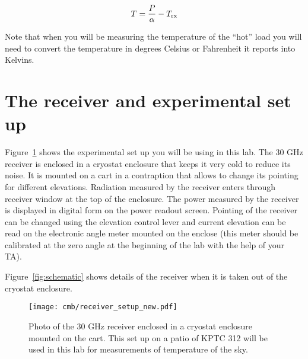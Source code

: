\begin{equation}
T={P\over \alpha} - T_\textrm{rx}
\label{five}
\end{equation}

Note that when you will be measuring the temperature of the ``hot'' load you will need to convert the temperature in degrees Celsius or Fahrenheit it reports into Kelvins.

\section{The receiver and experimental set up}

Figure~\ref{fig:CMBLab-photo} shows the experimental set up you will be using in this lab. The 30 GHz receiver is enclosed in a cryostat enclosure that keeps it very cold to reduce its noise. It is mounted on a cart in a contraption that allows to change its pointing for different elevations. Radiation measured by the receiver enters through receiver window at the top of the enclosure. The power measured by the receiver is displayed in digital form on the power readout screen. Pointing of the receiver can be changed using the elevation control lever and current elevation can be read on the electronic angle meter mounted on the enclose (this meter should be calibrated at the zero angle at the beginning of the lab with the help of your TA).

Figure~\ref{fig:schematic} shows details of the receiver when it is taken out of the cryostat enclosure.

\begin{figure}[ht]
	\begin{center}
		\texttt{[image: cmb/receiver\_setup\_new.pdf]}
		\caption{Photo of the 30 GHz receiver enclosed in a cryostat enclosure mounted on the cart. This set up on a patio of KPTC 312 will be used in this lab for measurements of temperature of the sky.}
		\label{fig:CMBLab-photo}
	\end{center}
\end{figure}

